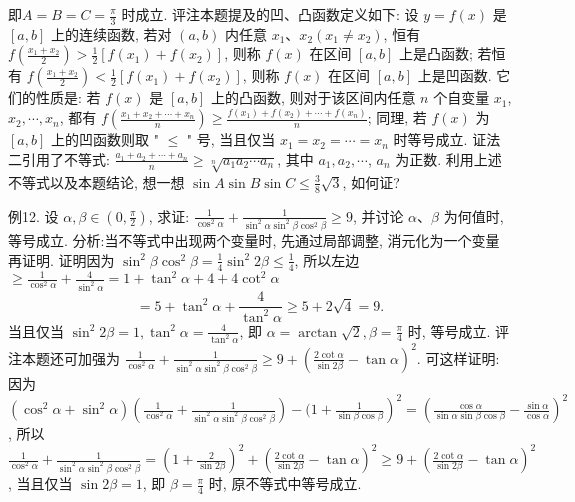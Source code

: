 即$A=B=C=\frac{\pi}{3}$ 时成立.
评注本题提及的凹、凸函数定义如下: 设 $y=f(x)$ 是 $[a, b]$ 上的连续函数, 若对 $(a, b)$ 内任意 $x_1 、 x_2\left(x_1 \neq x_2\right)$, 恒有 $f\left(\frac{x_1+x_2}{2}\right)>\frac{1}{2}\left[f\left(x_1\right)+\right. \left.f\left(x_2\right)\right]$, 则称 $f(x)$ 在区间 $[a, b]$ 上是凸函数; 若恒有 $f\left(\frac{x_1+x_2}{2}\right)<\frac{1}{2}\left[f\left(x_1\right)+\right. \left.f\left(x_2\right)\right]$, 则称 $f(x)$ 在区间 $[a, b]$ 上是凹函数.
它们的性质是:
若 $f(x)$ 是 $[a, b]$ 上的凸函数, 则对于该区间内任意 $n$ 个自变量 $x_1$, $x_2, \cdots, x_n$, 都有 $f\left(\frac{x_1+x_2+\cdots+x_n}{n}\right) \geqslant \frac{f\left(x_1\right)+f\left(x_2\right)+\cdots+f\left(x_n\right)}{n}$; 同理, 若 $f(x)$ 为 $[a, b]$ 上的凹函数则取 " $\leqslant$ " 号, 当且仅当 $x_1=x_2=\cdots=x_n$ 时等号成立.
证法二引用了不等式: $\frac{a_1+a_2+\cdots+a_n}{n} \geqslant \sqrt[n]{a_1 a_2 \cdots a_n}$, 其中 $a_1, a_2, \cdots$, $a_n$ 为正数.
利用上述不等式以及本题结论, 想一想 $\sin A \sin B \sin C \leqslant \frac{3}{8} \sqrt{3}$, 如何证?



例12. 设 $\alpha, \beta \in\left(0, \frac{\pi}{2}\right)$, 求证: $\frac{1}{\cos ^2 \alpha}+\frac{1}{\sin ^2 \alpha \sin ^2 \beta \cos ^2 \beta} \geqslant 9$, 并讨论 $\alpha 、 \beta$ 为何值时, 等号成立.
分析:当不等式中出现两个变量时, 先通过局部调整, 消元化为一个变量再证明.
证明因为 $\sin ^2 \beta \cos ^2 \beta=\frac{1}{4} \sin ^2 2 \beta \leqslant \frac{1}{4}$,
所以左边 $\geqslant \frac{1}{\cos ^2 \alpha}+\frac{4}{\sin ^2 \alpha}=1+\tan ^2 \alpha+4+4 \cot ^2 \alpha$
$$
=5+\tan ^2 \alpha+\frac{4}{\tan ^2 \alpha} \geqslant 5+2 \sqrt{4}=9 .
$$
当且仅当 $\sin ^2 2 \beta=1, \tan ^2 \alpha=\frac{4}{\tan ^2 \alpha}$, 即 $\alpha=\arctan \sqrt{2}, \beta=\frac{\pi}{4}$ 时, 等号成立.
评注本题还可加强为 $\frac{1}{\cos ^2 \alpha}+\frac{1}{\sin ^2 \alpha \sin ^2 \beta \cos ^2 \beta} \geqslant 9+\left(\frac{2 \cot \alpha}{\sin 2 \beta}-\tan \alpha\right)^2$.
可这样证明: 因为 $\left(\cos ^2 \alpha+\sin ^2 \alpha\right)\left(\frac{1}{\cos ^2 \alpha}+\frac{1}{\sin ^2 \alpha \sin ^2 \beta \cos ^2 \beta}\right)-(1+ \left.\frac{1}{\sin \beta \cos \beta}\right)^2=\left(\frac{\cos \alpha}{\sin \alpha \sin \beta \cos \beta}-\frac{\sin \alpha}{\cos \alpha}\right)^2$,
所以 $\frac{1}{\cos ^2 \alpha}+\frac{1}{\sin ^2 \alpha \sin ^2 \beta \cos ^2 \beta}=\left(1+\frac{2}{\sin 2 \beta}\right)^2+\left(\frac{2 \cot \alpha}{\sin 2 \beta}-\tan \alpha\right)^2 \geqslant 9+ \left(\frac{2 \cot \alpha}{\sin 2 \beta}-\tan \alpha\right)^2$, 当且仅当 $\sin 2 \beta=1$, 即 $\beta=\frac{\pi}{4}$ 时, 原不等式中等号成立.



